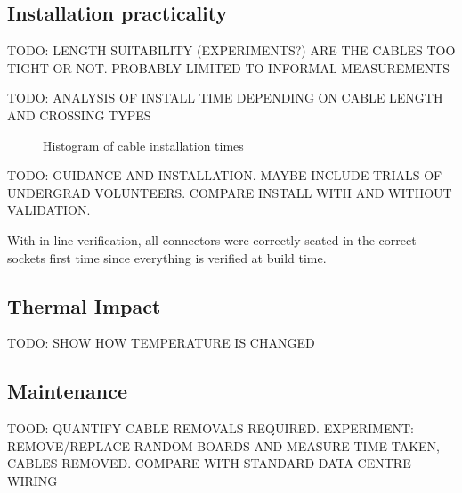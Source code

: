 		\subsection{Installation practicality}
			
			TODO: LENGTH SUITABILITY (EXPERIMENTS?) ARE THE CABLES TOO TIGHT OR NOT.
			PROBABLY LIMITED TO INFORMAL MEASUREMENTS
			
			TODO: ANALYSIS OF INSTALL TIME DEPENDING ON CABLE LENGTH AND CROSSING
			TYPES
			\begin{figure}
				\caption{Histogram of cable installation times}
			\end{figure}
			
			TODO: GUIDANCE AND INSTALLATION. MAYBE INCLUDE TRIALS OF UNDERGRAD
			VOLUNTEERS. COMPARE INSTALL WITH AND WITHOUT VALIDATION.
			
			With in-line verification, all connectors were correctly seated in the
			correct sockets first time since everything is verified at build time.
		
		\subsection{Thermal Impact}
			
			TODO: SHOW HOW TEMPERATURE IS CHANGED
			
		\subsection{Maintenance}
			
			TOOD: QUANTIFY CABLE REMOVALS REQUIRED. EXPERIMENT: REMOVE/REPLACE RANDOM
			BOARDS AND MEASURE TIME TAKEN, CABLES REMOVED. COMPARE WITH STANDARD DATA
			CENTRE WIRING

